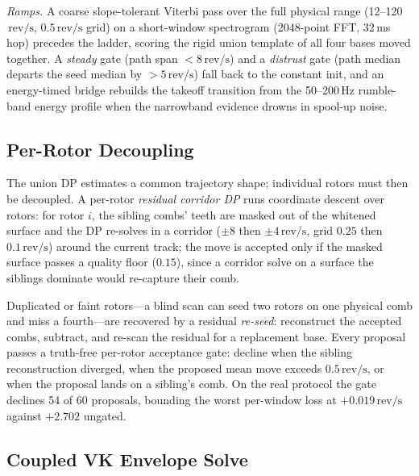 \documentclass[journal]{IEEEtran}
\newcommand{\revps}{\ensuremath{\,\mathrm{rev/s}}}
\begin{document}
\emph{Ramps.} A coarse slope-tolerant Viterbi pass over the full physical
range (12--120\revps, $0.5\revps$ grid) on a short-window spectrogram
(2048-point FFT, 32\,ms hop) precedes the ladder, scoring the rigid union
template of all four bases moved together. A \emph{steady} gate (path
span $< 8\revps$) and a \emph{distrust} gate (path median departs the
seed median by $> 5\revps$) fall back to the constant init, and an
energy-timed bridge rebuilds the takeoff transition from the 50--200\,Hz
rumble-band energy profile when the narrowband evidence drowns in
spool-up noise.

\subsection{Per-Rotor Decoupling}
\label{sec:decouple}

The union DP estimates a common trajectory shape; individual rotors must
then be decoupled. A per-rotor \emph{residual corridor DP} runs
coordinate descent over rotors: for rotor $i$, the sibling combs' teeth
are masked out of the whitened surface and the DP re-solves in a corridor
($\pm8$ then $\pm4\revps$, grid $0.25$ then $0.1\revps$) around the
current track; the move is accepted only if the masked surface passes a
quality floor ($0.15$), since a corridor solve on a surface the siblings
dominate would re-capture their comb.

Duplicated or faint rotors---a blind scan can seed two rotors on one
physical comb and miss a fourth---are recovered by a residual
\emph{re-seed}: reconstruct the accepted combs, subtract, and re-scan the
residual for a replacement base. Every proposal passes a truth-free
per-rotor acceptance gate: decline when the sibling reconstruction
diverged, when the proposed mean move exceeds $0.5\revps$, or when the
proposal lands on a sibling's comb. On the real protocol the gate
declines 54 of 60 proposals, bounding the worst per-window loss at
$+0.019\revps$ against $+2.702$ ungated.

\subsection{Coupled VK Envelope Solve}
\label{sec:vksolve}
\end{document}
